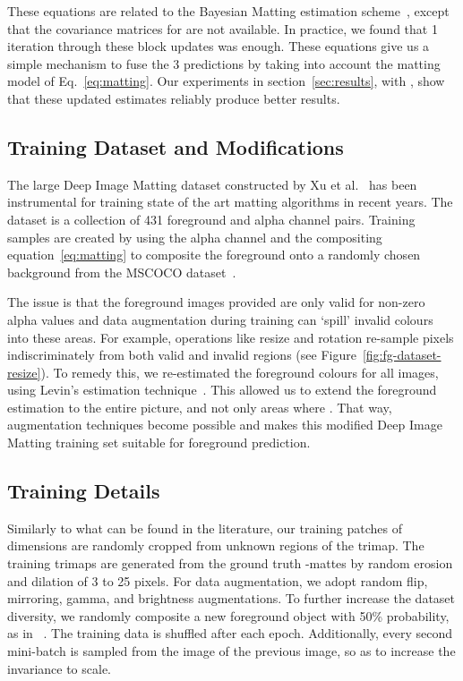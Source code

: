 \documentclass[runningheads]{llncs}
\begin{document}
These equations are related to the Bayesian Matting estimation scheme~\cite{bayesianMatting},
except that the covariance matrices for  are not available. In practice,
we found that 1 iteration through these block updates was enough. These
equations give us a simple mechanism to fuse the 3 predictions by taking into
account the matting model of Eq.~\ref{eq:matting}. Our experiments in section~\ref{sec:results}, with , show
that these updated estimates reliably produce better results.

\subsection{Training Dataset and Modifications}

The large Deep Image Matting dataset constructed by Xu et
al.~\cite{DeepImageMatting} has been instrumental for training state of the art
matting algorithms in recent years. The dataset is a collection of 431
foreground and alpha channel pairs. Training samples are created by using the
alpha channel and the compositing equation~\ref{eq:matting} to composite the foreground
onto a randomly chosen background from the MSCOCO dataset~\cite{mscoco}. 

The issue is that the foreground images provided are only valid for non-zero
alpha values and data augmentation during training can `spill' invalid colours
into these areas. For example, operations like resize and rotation re-sample
pixels indiscriminately from both valid and invalid regions (see
Figure~\ref{fig:fg-dataset-resize}). To remedy this, we re-estimated the foreground colours
for all images, using Levin's  estimation
technique~\cite{ClosedFormMattingPAMI}. This allowed us to extend the foreground
estimation to the entire picture, and not only areas where . That way,
augmentation techniques become possible and makes this modified Deep Image
Matting training set suitable for foreground prediction.

\subsection{Training Details}

Similarly to what can be found in the literature, our training patches of
dimensions  are randomly cropped
from unknown regions of the trimap. The training trimaps are generated from the
ground truth -mattes by random erosion and dilation of 3 to 25
pixels. For data augmentation, we adopt random flip, mirroring, gamma, and brightness augmentations. To further increase the dataset
diversity, we randomly composite a new foreground object with 50\% probability, as in ~\cite{LearningBasedSamplingMatting}. The training data is 
shuffled after each epoch. Additionally, every second mini-batch is 
sampled from the  image of the previous image, so as to increase the
invariance to scale.
\end{document}

